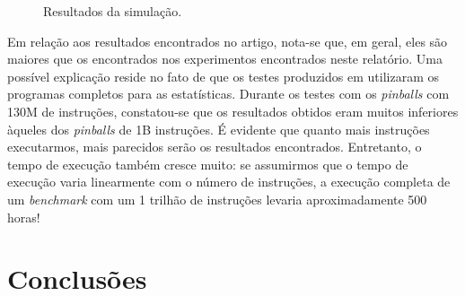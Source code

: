 \documentclass[12pt]{article}
\begin{document}
\begin{figure}[ht]
  \centering
  
  
  \caption{Resultados da simulação.}
\end{figure}

Em relação aos resultados encontrados no artigo, nota-se que, em geral, eles são
maiores que os encontrados nos experimentos encontrados neste relatório. Uma
possível explicação reside no fato de que os testes produzidos em \cite{artigo}
utilizaram os programas completos para as estatísticas. Durante os testes com os
\textit{pinballs} com 130M de instruções, constatou-se que os resultados obtidos
eram muitos inferiores àqueles dos \textit{pinballs} de 1B instruções. É
evidente que quanto mais instruções executarmos, mais parecidos serão os
resultados encontrados. Entretanto, o tempo de execução também cresce muito: se
assumirmos que o tempo de execução varia linearmente com o número de instruções,
a execução completa de um \textit{benchmark} com um 1 trilhão de instruções
levaria aproximadamente 500 horas!
  

\section{Conclusões}
\end{document}
